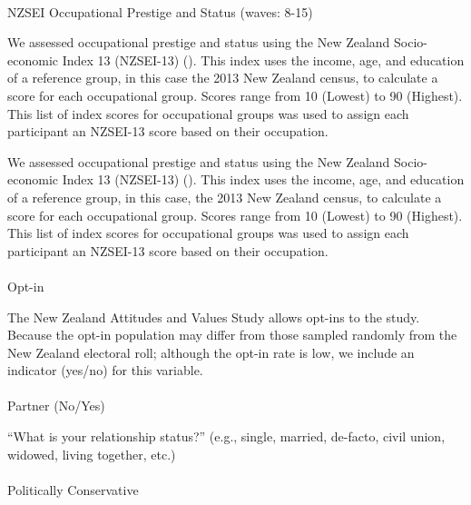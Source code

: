 \documentclass[
  single column]{article}
\makeatletter
\let\oldparagraph\paragraph
\renewcommand{\paragraph}{
    \@ifstar
      \xxxParagraphStar
      \xxxParagraphNoStar
  }
\newcommand{\xxxParagraphStar}[1]{\oldparagraph*{#1}\mbox{}}
\newcommand{\xxxParagraphNoStar}[1]{\oldparagraph{#1}\mbox{}}
\makeatother
\begin{document}
\paragraph{NZSEI Occupational Prestige and Status (waves:
8-15)}\label{nzsei-occupational-prestige-and-status-waves-8-15}

We assessed occupational prestige and status using the New Zealand
Socio-economic Index 13 (NZSEI-13) (). This index uses the income, age, and education of
a reference group, in this case the 2013 New Zealand census, to
calculate a score for each occupational group. Scores range from 10
(Lowest) to 90 (Highest). This list of index scores for occupational
groups was used to assign each participant an NZSEI-13 score based on
their occupation.

We assessed occupational prestige and status using the New Zealand
Socio-economic Index 13 (NZSEI-13) (). This index uses the income, age, and education of
a reference group, in this case, the 2013 New Zealand census, to
calculate a score for each occupational group. Scores range from 10
(Lowest) to 90 (Highest). This list of index scores for occupational
groups was used to assign each participant an NZSEI-13 score based on
their occupation.

\paragraph{Opt-in}\label{opt-in}

The New Zealand Attitudes and Values Study allows opt-ins to the study.
Because the opt-in population may differ from those sampled randomly
from the New Zealand electoral roll; although the opt-in rate is low, we
include an indicator (yes/no) for this variable.

\paragraph{Partner (No/Yes)}\label{partner-noyes}

``What is your relationship status?'' (e.g., single, married, de-facto,
civil union, widowed, living together, etc.)

\paragraph{Politically Conservative}\label{politically-conservative}
\end{document}

